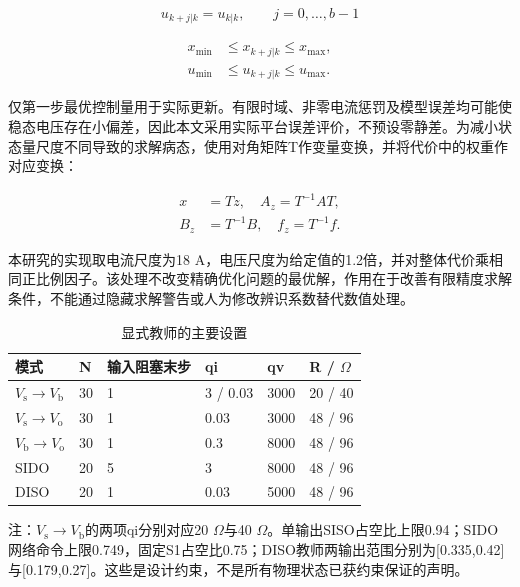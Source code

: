 \documentclass[UTF8,fontset=fandol,a4paper,twocolumn,10pt]{ctexart}
\begin{document}
\begin{equation}u_{k+j|k}=u_{k|k},\qquad j=0,\ldots,b-1\label{eq:20}\end{equation}

\begin{equation}\begin{aligned}x_{\min}&\le x_{k+j|k}\le x_{\max},\\ u_{\min}&\le u_{k+j|k}\le u_{\max}.\end{aligned}\label{eq:21}\end{equation}

仅第一步最优控制量用于实际更新。有限时域、非零电流惩罚及模型误差均可能使稳态电压存在小偏差，因此本文采用实际平台误差评价，不预设零静差。为减小状态量尺度不同导致的求解病态，使用对角矩阵T作变量变换，并将代价中的权重作对应变换：

\begin{equation}\begin{aligned}x&=Tz,\quad A_z=T^{-1}AT,\\ B_z&=T^{-1}B,\quad f_z=T^{-1}f.\end{aligned}\label{eq:22}\end{equation}

本研究的实现取电流尺度为18 A，电压尺度为给定值的1.2倍，并对整体代价乘相同正比例因子。该处理不改变精确优化问题的最优解，作用在于改善有限精度求解条件，不能通过隐藏求解警告或人为修改辨识系数替代数值处理。

\begin{table}[!tp]\centering\caption{显式教师的主要设置}\label{tab:2}\small\setlength{\tabcolsep}{3pt}
\begin{tabularx}{\textwidth}{YYYYYY}\toprule
\textbf{模式} & \textbf{N} & \textbf{输入阻塞末步} & \textbf{qi} & \textbf{qv} & \textbf{R / $\Omega$}\\\midrule
$V_{\mathrm s}$$\to$$V_{\mathrm b}$ & 30 & 1 & 3 / 0.03 & 3000 & 20 / 40\\
$V_{\mathrm s}$$\to$$V_{\mathrm o}$ & 30 & 1 & 0.03 & 3000 & 48 / 96\\
$V_{\mathrm b}$$\to$$V_{\mathrm o}$ & 30 & 1 & 0.3 & 8000 & 48 / 96\\
SIDO & 20 & 5 & 3 & 8000 & 48 / 96\\
DISO & 20 & 1 & 0.03 & 5000 & 48 / 96\\
\bottomrule\end{tabularx}
\par\vspace{3pt}\begin{minipage}{\textwidth}\footnotesize 注：$V_{\mathrm s}$$\to$$V_{\mathrm b}$的两项qi分别对应20 $\Omega$与40 $\Omega$。单输出SISO占空比上限0.94；SIDO网络命令上限0.749，固定S1占空比0.75；DISO教师两输出范围分别为[0.335,0.42]与[0.179,0.27]。这些是设计约束，不是所有物理状态已获约束保证的声明。\end{minipage}
\end{table}
\end{document}
